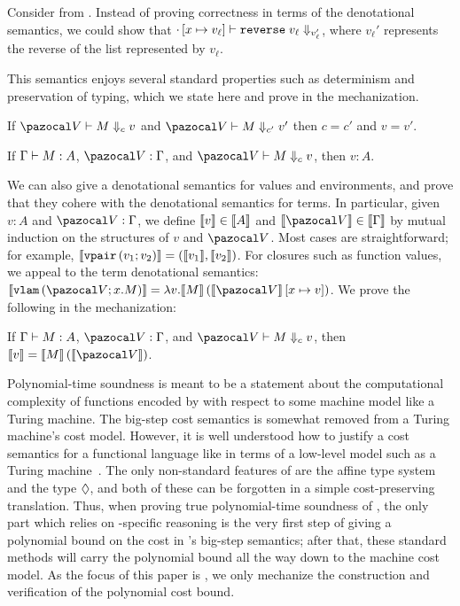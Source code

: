 \begin{example}
Consider  from . Instead of proving correctness in terms of the denotational semantics, we could show that $\evals{\envcons{\envnil}{x}{v_\ell}}{\tmapp{\code{reverse}}{v_\ell}}{v_\ell'}$, where $v_\ell'$ represents the reverse of the list represented by $v_\ell$.
\end{example}

This semantics enjoys several standard properties such as determinism and preservation of typing, which we state here and prove in the mechanization.

\begin{theorem}[Determinism]
If $\evals{\env}{M}{c}{v}$ and $\evals{\env}{M}{c'}{v'}$ then $c = c'$ and $v = v'$.
\end{theorem}

\begin{theorem}[Preservation]
If $\Gamma \vdash M : A$, $\envtypes{\env}{\Gamma}$, and $\evals{\env}{M}{c}{v}$, then $v : A$.
\end{theorem}
We can also give a denotational semantics for values and environments, and prove that they cohere with the denotational semantics for terms. In particular, given $v : A$ and $\envtypes{\env}{\Gamma}$, we define $\llbracket v \rrbracket \in \llbracket A \rrbracket$ and $\tpsem{\env} \in \tpsem{\Gamma}$ by mutual induction on the structures of $v$ and $\env$. Most cases are straightforward; for example, $\llbracket \mathtt{vpair}\left(v_1 ; v_2\right) \rrbracket = (\llbracket v_1 \rrbracket, \llbracket v_2 \rrbracket)$. For closures such as function values, we appeal to the term denotational semantics: $\tpsem{\vlam{\env}{x}{M}} = \lambda v . \tmsem{M}{\envcons{\tpsem{\env}}{x}{v}}$. We prove the following in the mechanization:

\begin{theorem}[Coherence]
\label{thm:coherence}
If $\Gamma \vdash M : A$, $\envtypes{\env}{\Gamma}$, and $\evals{\env}{M}{c}{v}$, then $\tpsem{v} = \tmsem{M}{\tpsem{\env}}$.
\end{theorem}

Polynomial-time soundness is meant to be a statement about the computational complexity of functions encoded by \lfpl with respect to some machine model like a Turing machine. The big-step cost semantics is somewhat removed from a Turing machine's cost model.
%
However, it is well understood how to justify a cost semantics for a functional language like \lfplplus in terms of a low-level model such as a Turing machine~\cite{blellochProvableTimeSpace1996,Accattoli2019}.
%
The only non-standard features of \lfpl are the affine type system and the type $\tpdiam$, and both of these can be forgotten in a simple cost-preserving translation.
%
Thus, when proving true polynomial-time soundness of \lfpl, the only part which relies on \lfpl-specific reasoning is the very first step of giving a polynomial bound on the cost in \lfpl's big-step semantics; after that, these standard methods will carry the polynomial bound all the way down to the machine cost model. As the focus of this paper is \lfpl, we only mechanize the construction and verification of the polynomial cost bound.



